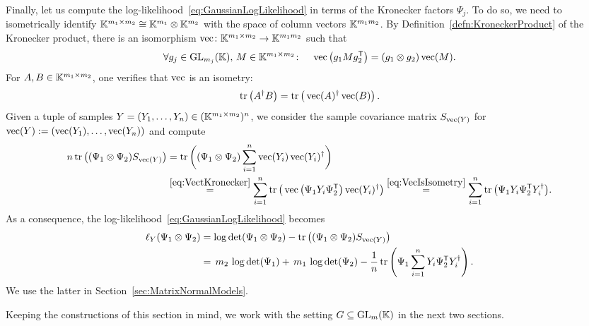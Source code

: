 \begin{example}
	Finally, let us compute the log-likelihood~\eqref{eq:GaussianLogLikelihood} in terms of the Kronecker factors $\Psi_j$. To do so, we need to isometrically identify $\mathbb K^{m_1 \times m_2} \cong \mathbb K^{m_1} \otimes \mathbb K^{m_2}$ with the space of column vectors $\mathbb K^{m_1 m_2}$. By Definition~\ref{defn:KroneckerProduct} of the Kronecker product, there is an isomorphism $\operatorname{vec} \colon \mathbb K^{m_1 \times m_2} \to \mathbb K^{m_1 m_2}$ such that
		\begin{equation}\label{eq:VectKronecker}
			\forall g_j \in \operatorname{GL}_{m_j}(\mathbb K), \, M \in \mathbb K^{m_1 \times m_2} \colon \quad  \operatorname{vec} \big( g_1 M g_2^{\mathsf{T}} \big) = (g_1 \otimes g_2) \operatorname{vec}(M) .
		\end{equation}
 	For $A,B \in \mathbb K^{m_1 \times m_2}$, one verifies that $\operatorname{vec}$ is an isometry:
 		\begin{equation}\label{eq:VecIsIsometry}
 			\operatorname{tr} \big( A^{\dagger} B \big) = \operatorname{tr} \big( \operatorname{vec}(A)^{\dagger} \operatorname{vec}(B) \big) \, .
 		\end{equation}
 	Given a tuple of samples $Y = (Y_1, \ldots, Y_n) \in (\mathbb K^{m_1 \times m_2})^n$, we consider the sample covariance matrix $S_{\operatorname{vec}(Y)}$ for $\operatorname{vec}(Y) := (\operatorname{vec}(Y_1), \ldots, \operatorname{vec}(Y_n))$ and compute
 		\begin{align*}
 			n \operatorname{tr} \big( (\Psi_1 \otimes \Psi_2) S_{\operatorname{vec}(Y)} \big) &= \operatorname{tr} \bigg( (\Psi_1 \otimes \Psi_2) \sum_{i=1}^n \operatorname{vec}(Y_i) \operatorname{vec}(Y_i) ^{\dagger}\bigg) \\
 			& \overset{\eqref{eq:VectKronecker}}{=} \sum_{i=1}^n \operatorname{tr} \big( \operatorname{vec} \big(\Psi_1 Y_i \Psi_2^{\mathsf{T}} \big) \operatorname{vec}(Y_i)^{\dagger} \big)
 			\overset{\eqref{eq:VecIsIsometry}}{=} \sum_{i=1}^{n} \operatorname{tr} \big( \Psi_1 Y_i \Psi_2^{\mathsf{T}} Y_i^{\dagger} \big) .
 		\end{align*}
 	As a consequence, the log-likelihood~\eqref{eq:GaussianLogLikelihood} becomes
 		\begin{align*}
 			\ell_Y(\Psi_1 \otimes \Psi_2) &= \log \det (\Psi_1 \otimes \Psi_2) - \operatorname{tr} \big( (\Psi_1 \otimes \Psi_2) S_{\operatorname{vec}(Y)} \big) \\
 			&=  \, m_2 \, \log \det (\Psi_1) +  \, m_1 \, \log \det (\Psi_2) - \frac{1}{n} \operatorname{tr} \left( \Psi_1 \sum_{i=1}^n Y_i \Psi_2^{\mathsf{T}} Y_i^{\dagger} \right).
 		\end{align*}
 	We use the latter in Section~\ref{sec:MatrixNormalModels}.
	\hfill\exSymbol
\end{example}

Keeping the constructions of this section in mind, we work with the setting $G \subseteq \operatorname{GL}_m(\mathbb K)$ in the next two sections.

